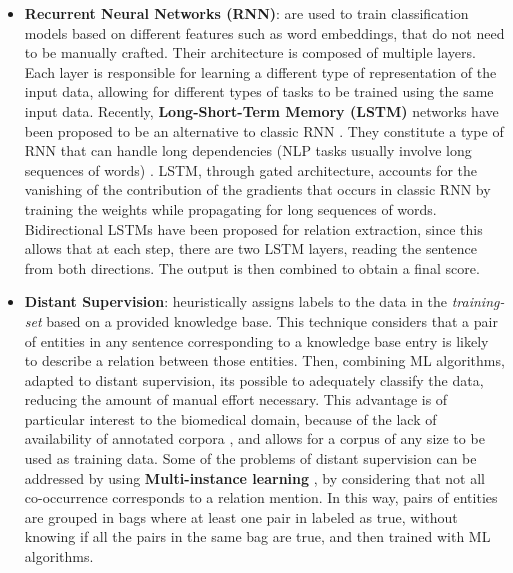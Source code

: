 \documentclass[11pt]{article}
\begin{document}
\begin{itemize}

\item{\textbf{Recurrent Neural Networks (RNN)}: are used to train classification models based on different features such as word embeddings, that do not need to be manually crafted. Their architecture is composed of multiple layers. Each layer is responsible for learning a different type of representation of the input data, allowing for different types of tasks to be trained using the same input data. Recently, \textbf{Long-Short-Term Memory (LSTM)} networks have been proposed to be an alternative to classic RNN \cite{Hochreiter:1997:LSM:1246443.1246450}. They constitute a type of RNN that can handle long dependencies (NLP tasks usually involve long sequences of words) \cite{BOLSTM}. LSTM, through gated architecture, accounts for the vanishing of the contribution of the gradients that occurs in classic RNN by training the weights while propagating for long sequences of words. Bidirectional LSTMs have been proposed for relation extraction, since this allows that at each step, there are two LSTM layers, reading the sentence from both directions. The output is then combined to obtain a final score.}

\item{\textbf{Distant Supervision}: heuristically assigns labels to the data in the \textit{training-set} based on a provided knowledge base. This technique considers that a pair of entities in any sentence corresponding to a knowledge base entry is likely to describe a relation between those entities. Then, combining ML algorithms, adapted to distant supervision, its possible to adequately classify the data, reducing the amount of manual effort necessary. This advantage is of particular interest to the biomedical domain, because of the lack of availability of annotated corpora \cite{10.1371/journal.pone.0171929}, and allows for a corpus of any size to be used as training data. Some of the problems of distant supervision can be addressed by using \textbf{Multi-instance learning} \cite{Dietterich:1997:SMI:249678.249682}, by considering that not all co-occurrence corresponds to a relation mention. In this way, pairs of entities are grouped in bags where at least one pair in labeled as true, without knowing if all the pairs in the same bag are true, and then trained with ML algorithms.}

\end{itemize}

\end{document}
